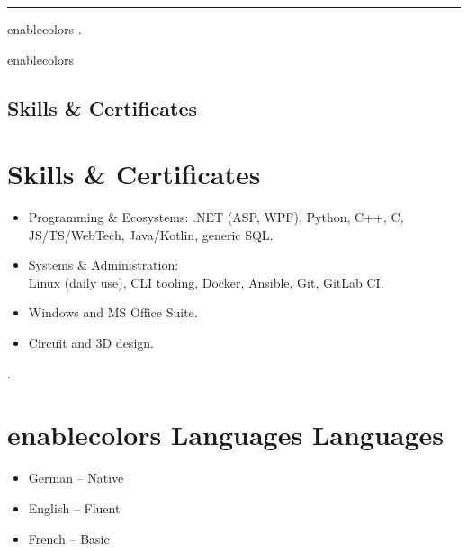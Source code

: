 \documentclass[a4paper,11pt]{article}
\newcommand{\col}[2]{
    \ifcsname enablecolors\endcsname
        \textcolor[HTML]{#1}{#2}
    \else
        #2
    \fi
}
\begin{document}
\vspace{0.25cm}

\hrule

\vspace{-0.5cm} %

\begin{minipage}[t]{0.51\textwidth}
    \ifcsname enablecolors\endcsname
    \else
        \textcolor[HTML]{ffffff}{.}
    \fi
    \col{6c84ac}{\section*{Skills \& Certificates}}
    \begin{itemize}
        \small
        \item Programming \& Ecosystems:
        .NET (ASP, WPF), Python, C++, C, JS/TS/WebTech, Java/Kotlin, generic SQL.

        \item Systems \& Administration:\\
        Linux (daily use), CLI tooling, Docker, Ansible, Git, GitLab CI.

        \item Windows and MS Office Suite.

        \item Circuit and 3D design.
    \end{itemize}
\end{minipage}
%
\hfill
%
\begin{minipage}[t]{0.18\textwidth}
    \textcolor[HTML]{ffffff}{.} %
    \section*{\col{6c84ac}{Languages}}
    \begin{flushleft}
        \begin{itemize}
            \small
            \item German -- Native
            \item English -- Fluent
            \item French -- Basic
        \end{itemize}
    \end{flushleft}
\end{minipage}
%
\hfill
%
\end{document}
